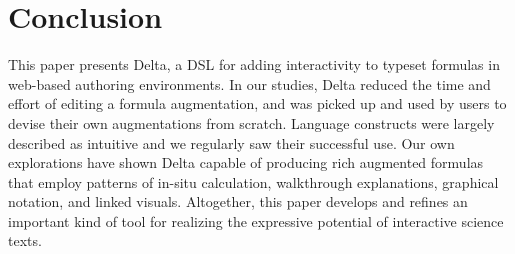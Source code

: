 \section{Conclusion}

This paper presents Delta, a DSL for adding interactivity to typeset formulas in web-based authoring environments. In our studies, Delta reduced the time and effort of editing a formula augmentation, and was picked up and used by users to devise their own augmentations from scratch. Language constructs were largely described as intuitive and we regularly saw their successful use. Our own explorations have shown Delta capable of producing rich augmented formulas that employ patterns of in-situ calculation, walkthrough explanations, graphical notation, and linked visuals. Altogether, this paper develops and refines an important kind of tool for realizing the expressive potential of interactive science texts.